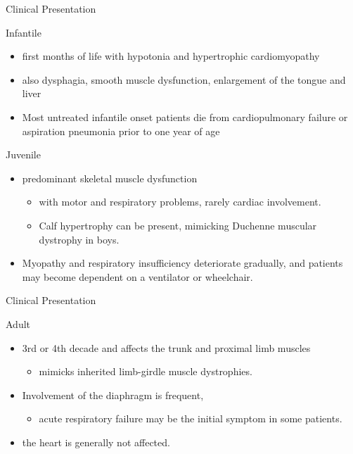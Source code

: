 \documentclass[presentation, smaller]{beamer}
\begin{document}
\begin{frame}[label={sec:orgbe8611a}]{Clinical Presentation}
\begin{block}{Infantile}
\begin{itemize}
\item first months of life with hypotonia and hypertrophic cardiomyopathy
\item also dysphagia, smooth muscle dysfunction, enlargement of the tongue
and liver
\item Most untreated infantile onset patients die from cardiopulmonary
failure or aspiration pneumonia prior to one year of age
\end{itemize}
\end{block}
\begin{block}{Juvenile}
\begin{itemize}
\item predominant skeletal muscle dysfunction
\begin{itemize}
\item with motor and respiratory problems, rarely cardiac involvement.
\item Calf hypertrophy can be present, mimicking Duchenne muscular dystrophy in boys.
\end{itemize}
\item Myopathy and respiratory insufficiency deteriorate gradually, and patients may become dependent on a ventilator or wheelchair.
\end{itemize}
\end{block}
\end{frame}
\begin{frame}[label={sec:orgf5880df}]{Clinical Presentation}
\begin{block}{Adult}
\begin{itemize}
\item 3rd or 4th decade and affects the trunk and proximal limb muscles
\begin{itemize}
\item mimicks inherited limb-girdle muscle dystrophies.
\end{itemize}
\item Involvement of the diaphragm is frequent,
\begin{itemize}
\item acute respiratory failure may be the initial symptom in some patients.
\end{itemize}
\item the heart is generally not affected.
\end{itemize}
\end{block}
\end{frame}
\end{document}
